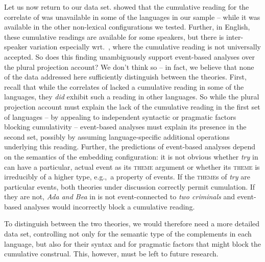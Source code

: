 \documentclass[output=paper]{langscibook}
\begin{document}
\noindent Let us now return to our data set.  showed that the cumulative reading for the correlate of  was unavailable in some of the languages in our sample -- while it was available in the other non-lexical configurations we tested. Further, in English, these cumulative readings are available for some speakers, but there is inter-speaker variation especially wrt.~, where the cumulative reading is not universally accepted. So does this finding unambiguously support event-based analyses over the plural projection account? We don't think so -- in fact, we believe that none of the data addressed here sufficiently  distinguish between the theories. First, recall that while the correlates of  lacked a cumulative reading in some of the languages, they \textit{did} exhibit such a reading in other languages. So while the plural projection account  must explain the lack of the cumulative reading in the first set of languages  -- by appealing to independent syntactic or pragmatic factors blocking cumulativity -- event-based analyses must explain its presence in the second set, possibly by assuming language-specific additional operations underlying this reading. Further, the predictions of  event-based analyses depend on the semantics of the embedding configuration: it is not obvious whether \textit{try} in  can have a particular, actual event as its \textsc{theme} argument or whether its \textsc{theme} is irreducibly of a higher type, e.g.,~a property of events. If the \textsc{theme}s of \textit{try} are particular events, both theories under discussion correctly permit cumulation. If they are not, \textit{Ada and Bea} in  is not event-connected to \textit{two criminals} and event-based analyses would incorrectly block a cumulative reading.

To distinguish between the two theories, we would therefore need a more detailed data set, controlling not only for the semantic type of the complements in each language, but also for their syntax and for pragmatic factors that might block the cumulative construal. This, however, must be left to future research.
\end{document}
